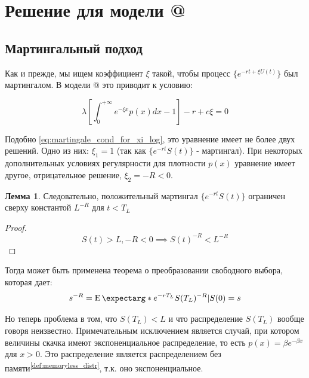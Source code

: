 \documentclass[a4paper,12pt]{article}
\makeatletter
\theoremstyle{definition}
\newtheorem{lemma}{Лемма}
\newcommand*{\rom}[1]{\expandafter\@slowromancap\romannumeral #1@}
\newcommand{\expect}{\operatorname{E}\expectarg}
\makeatother
\begin{document}
\section{Решение для модели \rom{2}}

\subsection{Мартингальный подход}

Как и прежде, мы ищем коэффициент $\xi$ такой, чтобы
процесс $\{e^{-rt + \xi U(t)}\}$ был мартингалом. В модели \rom{2} это
приводит к условию:

\begin{equation}
    \lambda \left[ \int_{0}^{+\infty} e^{-\xi x} p(x) dx - 1 \right] - r + c \xi = 0
\end{equation}

Подобно \eqref{eq:martingale_cond_for_xi_log}, это уравнение имеет не более двух решений. Одно из них: $\xi_1 = 1$ (так как $\{e^{-rt} S(t)\}$ - мартингал).
При некоторых дополнительных условиях регулярности для плотности $p(x)$ уравнение имеет другое, отрицательное решение, $\xi_2 = -R < 0$.

\begin{lemma}
Следовательно, положительный мартингал  $\{e^{-rt} S(t)\}$ ограничен сверху константой $L^{-R}$ для $t < T_L$
\end{lemma}
\begin{proof}
\begin{equation*}
    S(t) > L, -R < 0 \implies S(t)^{-R} < L ^{-R}
\end{equation*}
\end{proof}

Тогда может быть применена теорема о преобразовании свободного выбора, которая дает:
\begin{equation*}
    s^{-R} = \expect*{e^{-rT_L} S(T_L)^{-R} | S(0) = s}
\end{equation*}

Но теперь проблема в том, что $S(T_L) < L$ и что
распределение $S(T_L)$ вообще говоря неизвестно. Примечательным исключением является случай, при котором величины скачка имеют экспоненциальное распределение, то есть $p(x) = \beta e^{-\beta x}$ для $x > 0$. Это распределение является распределением без памяти\textsuperscript{{\ref{def:memoryless_distr}}}, т.к. оно экспоненциальное.
\end{document}
